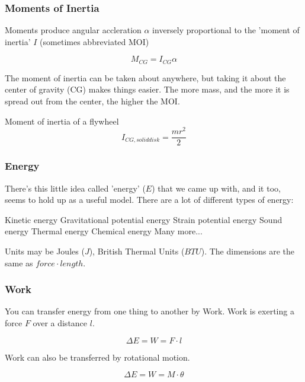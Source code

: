 \documentclass{beamer}%
\begin{document}
\begin{frame}
\frametitle{Moments of Inertia}

Moments produce angular accleration $\alpha$ inversely proportional to the 'moment of inertia' $I$ (sometimes abbreviated MOI)

\begin{equation}
	M_{CG} = I_{CG} \alpha
\end{equation}

The moment of inertia can be taken about anywhere, but taking it about the center of gravity (CG) makes things easier. The more mass, and the more it is spread out from the center, the higher the MOI.

\begin{example}
Moment of inertia of a flywheel
\begin{equation}
	I_{CG, solid disk} = \frac{m r^2}{2}
\end{equation}
\end{example}

\end{frame}

\begin{frame}
	\frametitle{Energy}
	
	There's this little idea called 'energy' ($E$) that we came up with, and it too, seems to hold up as a useful model. There are a lot of different types of energy:
	\begin{outline}
		\1 Kinetic energy
		\1 Gravitational potential energy
		\1 Strain potential energy
		\1 Sound energy
		\1 Thermal energy
		\1 Chemical energy
		\1 Many more...
	\end{outline}
	
	Units may be Joules ($J$), British Thermal Units ($BTU$).
	The dimensions are the same as $force \cdot length$.
\end{frame}

\begin{frame}
	\frametitle{Work}
	
	You can transfer energy from one thing to another by Work. Work is exerting a force $F$ over a distance $l$.
	
	\begin{equation}
		\Delta E = W = F \cdot l
	\end{equation}
	
	Work can also be transferred by rotational motion.
	
	\begin{equation}
		\Delta E = W = M \cdot \theta
	\end{equation}
	
\end{frame}
\end{document}
